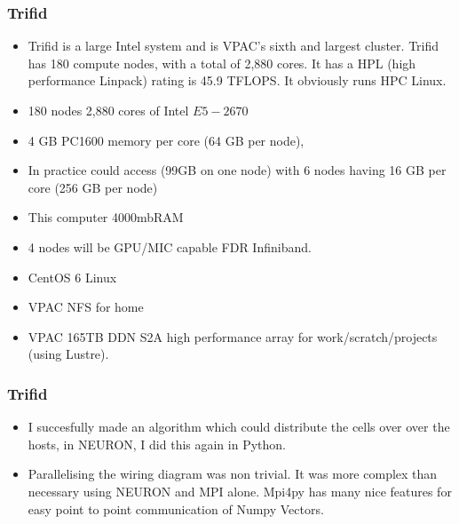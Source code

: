 \documentclass{beamer}
\begin{document}
\begin{frame}
\frametitle{Trifid}
\begin{itemize}
\vfill \item Trifid is a large Intel system and is VPAC's sixth and largest cluster. Trifid has 180 compute nodes, with a total of 2,880 cores. It has a HPL (high performance Linpack) rating is 45.9 TFLOPS. It obviously runs HPC Linux.
\vfill \item 180 nodes
2,880 cores of Intel $E5-2670$
\vfill \item 4 GB PC1600 memory per core (64 GB per node),
\vfill \item In practice could access (99GB on one node)%
 with 6 nodes having 16 GB per core (256 GB per node)
\vfill \item This computer 4000mbRAM
\vfill \item 4 nodes will be GPU/MIC capable
FDR Infiniband.
\vfill \item CentOS 6 Linux
\vfill \item VPAC NFS for home
\vfill \item VPAC 165TB DDN S2A high performance array for work/scratch/projects (using Lustre).


\end{itemize}
\end{frame}

\begin{frame}
\frametitle{Trifid}
\begin{itemize}
\vfill \item I succesfully made an algorithm which could distribute the cells over over the hosts, in NEURON, I did this again in Python.

\vfill \item Parallelising the wiring diagram was non trivial. It was more complex than necessary using NEURON and MPI alone. Mpi4py has many nice features for easy point to point communication of Numpy Vectors. 


\end{itemize}
\end{frame}	

\end{document}
